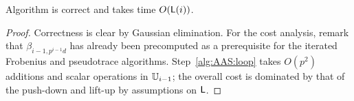
\begin{theorem}
  \label{th:approximateAS}
  Algorithm \hyperref[alg:approximateas]{} is correct and takes time $O(\mathsf{L}(i))$.
\end{theorem}

\begin{proof}
  Correctness is clear by Gaussian elimination.  For the cost
  analysis, remark that $\beta_{i-1,p^{i-1}d}$ has already been
  precomputed as a prerequisite for the iterated Frobenius and
  pseudotrace algorithms. Step~\ref{alg:AAS:loop} takes $O(p^2)$
  additions and scalar operations in $\mathbb{U}_{i-1}$; the overall cost is
  dominated by that of the push-down and lift-up by assumptions on
  $\mathsf{L}$.
\end{proof}



